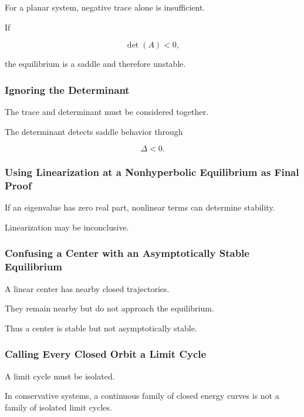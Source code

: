 For a planar system, negative trace alone is insufficient.

If

\[
\det(A)<0,
\]

the equilibrium is a saddle and therefore unstable.

\subsubsection{Ignoring the Determinant}

The trace and determinant must be considered together.

The determinant detects saddle behavior through

\[
\boxed{
\Delta<0.
}
\]

\subsubsection{Using Linearization at a Nonhyperbolic Equilibrium as Final Proof}

If an eigenvalue has zero real part, nonlinear terms can determine
stability.

Linearization may be inconclusive.

\subsubsection{Confusing a Center with an Asymptotically Stable Equilibrium}

A linear center has nearby closed trajectories.

They remain nearby but do not approach the equilibrium.

Thus a center is stable but not asymptotically stable.

\subsubsection{Calling Every Closed Orbit a Limit Cycle}

A limit cycle must be isolated.

In conservative systems, a continuous family of closed energy curves is
not a family of isolated limit cycles.

